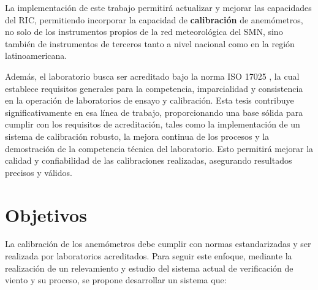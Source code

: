  La implementación de este trabajo permitirá actualizar y mejorar las capacidades del RIC, permitiendo incorporar la capacidad de \textbf{calibración} de anemómetros, no solo de los instrumentos propios de la red meteorológica del SMN, sino también de instrumentos de terceros tanto a nivel nacional como en la región latinoamericana. 

Además, el laboratorio busca ser acreditado bajo la norma ISO 17025 \cite{ISO17025}, la cual establece requisitos generales para la competencia, imparcialidad y consistencia en la operación de laboratorios de ensayo y calibración. Esta tesis contribuye significativamente en esa línea de trabajo, proporcionando una base sólida para cumplir con los requisitos de acreditación, tales como la implementación de un sistema de calibración robusto, la mejora continua de los procesos y la demostración de la competencia técnica del laboratorio. Esto permitirá mejorar la calidad y confiabilidad de las calibraciones realizadas, asegurando resultados precisos y válidos.

\section{Objetivos}\label{sec:objetivos}

La calibración de los anemómetros debe cumplir con normas estandarizadas \cite{IEC61400-12-1} \cite{ISO16622} \cite{ISO17713-1} y ser realizada por laboratorios acreditados. Para seguir este enfoque, mediante la realización de un relevamiento y estudio del sistema actual de verificación de viento y su proceso, se propone desarrollar un sistema que:


